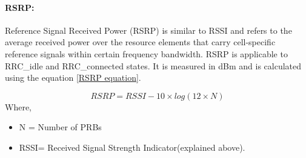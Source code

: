 \documentclass[12pt]{article}
\begin{document}
\begin{table}[H]
\caption {RSSI reference values for Sigfox \cite{sigfoxRSSI}}
\centering
{}
\label{sigfoxRSSI}
\end{table}


\paragraph{RSRP:}
Reference Signal Received Power (RSRP) is similar to RSSI and refers to the average received power over the resource elements that carry cell-specific reference signals within  certain  frequency  bandwidth. RSRP is applicable to RRC\_idle and RRC\_connected  states. It is measured in dBm and is calculated using the equation \ref{RSRP equation}.

\begin{equation}
    RSRP = {{RSSI - 10\times log (12\times N) }}
    \label{RSRP equation}
\end{equation}
Where, 
\begin{itemize}
    \item N = Number of PRBs 
    \item RSSI= Received Signal Strength Indicator(explained above).
\end{itemize}
\end{document}
